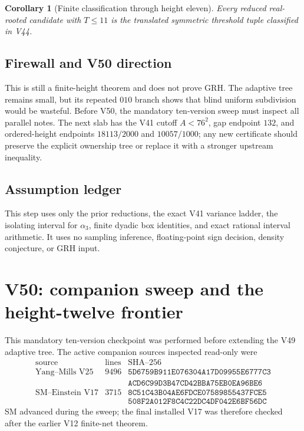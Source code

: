 \documentclass[11pt]{article}
\newtheorem{corollary}[theorem]{Corollary}
\theoremstyle{definition}
\theoremstyle{remark}
\begin{document}
\begin{corollary}[Finite classification through height eleven]
\label{cor:f2v49-through-eleven}
Every reduced real-rooted candidate with \(T\le11\) is the translated
symmetric threshold tuple classified in V44.
\end{corollary}

\subsection*{Firewall and V50 direction}
\label{fire:f2v49}
This is still a finite-height theorem and does not prove GRH.  The
adaptive tree remains small, but its repeated \(010\) branch shows that
blind uniform subdivision would be wasteful.  Before V50, the mandatory
ten-version sweep must inspect all parallel notes.  The next slab has the
V41 cutoff \(A<76^2\), gap endpoint \(132\), and ordered-height endpoints
\(18113/2000\) and \(10057/1000\); any new certificate should preserve
the explicit ownership tree or replace it with a stronger upstream
inequality.

\subsection*{Assumption ledger}
\label{ass:f2v49}
This step uses only the prior reductions, the exact V41 variance ladder,
the isolating interval for \(\alpha_3\), finite dyadic box identities, and
exact rational interval arithmetic.  It uses no sampling inference,
floating-point sign decision, density conjecture, or GRH input.
\endgroup



\clearpage
\section{V50: companion sweep and the height-twelve frontier}
\label{sec:f2v50-sweep-frontier}
\begingroup
\setcounter{equation}{0}
\renewcommand{\theequation}{N50.\arabic{equation}}
\renewcommand{\theHequation}{f2v50.\arabic{equation}}

This mandatory ten-version checkpoint was performed before extending the
V49 adaptive tree.  The active companion sources inspected read-only were
\begin{equation}
\begin{array}{c|r|l}
\text{source}&\text{lines}&\text{SHA--256}\\ \hline
\text{Yang--Mills V25}&9496&
\texttt{5D6759B911E076304A17D09955E6777C3}\\
&&\texttt{ACD6C99D3B47CD42BBA75EB0EA96BE6}\\
\text{SM--Einstein V17}&3715&
\texttt{8C51C43B04AE6FDCE07589855437FCE5}\\
&&\texttt{508F2A012F8C4C22DC4DF042E6BF56DC}
\end{array}
\label{eq:f2v50-sources}
\end{equation}
SM advanced during the sweep; the final installed V17 was therefore
checked after the earlier V12 finite-net theorem.
\end{document}
